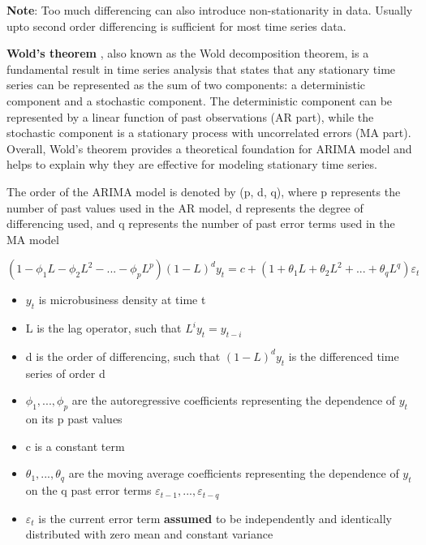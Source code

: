 \documentclass{article}
\begin{document}
\textbf{Note}: Too much differencing can also introduce non-stationarity in data. Usually upto second order differencing is sufficient for most time series data. 

\vspace{1em}
\textbf{Wold's theorem} \cite{wold}, also known as the Wold decomposition theorem, is a fundamental result in time series analysis that states that any stationary time series can be represented as the sum of two components: a deterministic component and a stochastic component. The deterministic component can be represented by a linear function of past observations (AR part), while the stochastic component is a stationary process with uncorrelated errors (MA part). Overall, Wold's theorem provides a theoretical foundation for ARIMA model and helps to explain why they are effective for modeling stationary time series.


\vspace{1em}
The order of the ARIMA model is denoted by (p, d, q), where p represents the number
of past values used in the AR model, d represents the degree of differencing used, and q represents the number of past error terms used in the MA model



\vspace{1em}
\begin{center}
	\begin{tcolorbox}[colframe=orange,boxsep=5pt,boxrule=1pt,colback=white, width=0.8\linewidth]
		$
	(1 - \phi_1 L - \phi_2 L^2 - ... - \phi_p L^p)(1 - L)^d y_t = c + (1 + \theta_1 L + \theta_2 L^2 + ... + \theta_q L^q)\varepsilon_t		$
	\end{tcolorbox}
\end{center}

\vspace{1em}

\begin{itemize}
	\item $y_t$ is microbusiness density at time t 
	\item L is the lag operator, such that $L^i y_t = y_{t-i}$
	\item d is the order of differencing, such that $(1-L)^d y_t$ is the differenced time series of order d
	\item $\phi_1, ..., \phi_p$ are the autoregressive coefficients representing the dependence of $y_t$ on its p past values
	\item c is a constant term
	\item $\theta_1, ..., \theta_q$ are the moving average coefficients representing the dependence of $y_t$ on the q past error terms $\varepsilon_{t-1}, ..., \varepsilon_{t-q}$
	\item $\varepsilon_t$ is the current error term \textbf{assumed} to be independently and identically distributed with zero mean and constant variance
\end{itemize}
\end{document}

